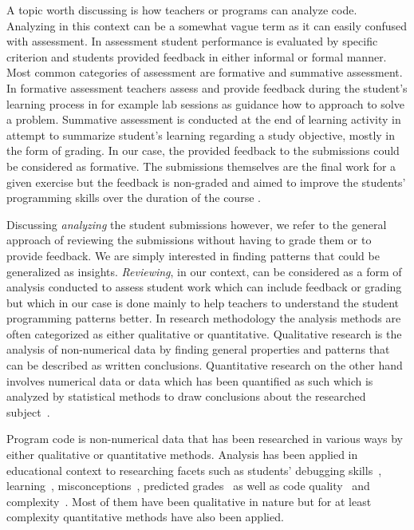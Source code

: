 A topic worth discussing is how teachers or programs can analyze code. Analyzing in this context can be a somewhat vague term as it can easily confused with assessment. In assessment student performance is evaluated by specific criterion and students provided feedback in either informal or formal manner. Most common categories of assessment are formative and summative assessment. In formative assessment teachers assess and provide feedback during the student's learning process in for example lab sessions as guidance how to approach to solve a problem. Summative assessment is conducted at the end of learning activity in attempt to summarize student's learning regarding a study objective, mostly in the form of grading. In our case, the provided feedback to the submissions could be considered as formative. The submissions themselves are the final work for a given exercise but the feedback is non-graded and aimed to improve the students' programming skills over the duration of the course \cite{assessment}.

Discussing \textit{analyzing} the student submissions however, we refer to the general approach of reviewing the submissions without having to grade them or to provide feedback. We are simply interested in finding patterns that could be generalized as insights. \textit{Reviewing}, in our context, can be considered as a form of analysis conducted to assess student work which can include feedback or grading but which in our case is done mainly to help teachers to understand the student programming patterns better. In research methodology the analysis methods are often categorized as either qualitative or quantitative. Qualitative research is the analysis of non-numerical data by finding general properties and patterns that can be described as written conclusions. Quantitative research on the other hand involves numerical data or data which has been quantified as such which is analyzed by statistical methods to draw conclusions about the researched subject~\cite{strengths-limits-qual-quant}.

Program code is non-numerical data that has been researched in various ways by either qualitative or quantitative methods. Analysis has been applied in educational context to researching facets such as students' debugging skills~\cite{static-analyses-in-py-courses}, learning~\cite{static-analyses-in-py-courses}, misconceptions~\cite{programming-errors}, predicted grades~\cite{analyzing-student-patterns} as well as code quality~\cite{static-analyses-in-py-courses, alamutka-2005-auto-ass-survey} and complexity~\cite{alamutka-2005-auto-ass-survey}. Most of them have been qualitative in nature but for at least complexity quantitative methods have also been applied.

